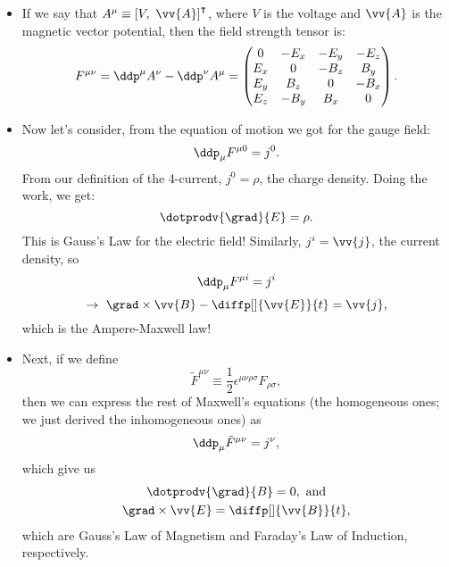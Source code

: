 \begin{itemize}
    \item If we say that $A^{\mu} \equiv \left[ V,\ \vv{A} \right]^{\intercal}$, where $V$ is the voltage and $\vv{A}$ is the magnetic vector potential, then the field strength tensor is:
        \begin{equation}
            F^{\mu\nu} = \ddp^{\mu}A^{\nu} - \ddp^{\nu}A^{\mu} = 
                \begin{pmatrix}
                    0 & -E_x & -E_y & -E_z \\
                    E_x & 0 & -B_z & B_y \\
                    E_y & B_z & 0 & -B_x \\
                    E_z & -B_y & B_x & 0 
                \end{pmatrix}.
        \end{equation}
    \item Now let's consider, from the equation of motion we got for the gauge field:
        \begin{equation*}
            \ddp_{\mu}F^{\mu0} = j^0.
        \end{equation*}
        From our definition of the 4-current, $j^{0} = \rho$, the charge density. Doing the work, we get:
        \begin{equation}
            \dotprodv{\grad}{E} = \rho.\label{eq:GaussLawE}
        \end{equation}
        This is Gauss's Law for the electric field! Similarly, $j^i = \vv{j}$, the current density, so
        \begin{equation*}
            \ddp_{\mu}F^{\mu i} = j^i
        \end{equation*}
        \begin{equation}
            \rightarrow\ \grad\times\vv{B} - \diffp[]{\vv{E}}{t} = \vv{j},\label{eq:AmpereMaxwellLaw}
        \end{equation}
        which is the Ampere-Maxwell law!
    \item Next, if we define
        \begin{equation}
            \tilde{F}^{\mu\nu} \equiv \frac{1}{2}\epsilon^{\mu\nu\rho\sigma}F_{\rho\sigma},
        \end{equation}
        then we can express the rest of Maxwell's equations (the homogeneous ones; we just derived the inhomogeneous ones) as
        \begin{equation}
            \ddp_{\mu}\tilde{F}^{\mu\nu} = j^{\nu},
        \end{equation}
        which give us
        \begin{gather}
            \dotprodv{\grad}{B} = 0,\ \mathrm{and} \\
            \grad\times\vv{E} = \diffp[]{\vv{B}}{t},
        \end{gather}
        which are Gauss's Law of Magnetism and Faraday's Law of Induction, respectively.
\end{itemize}


